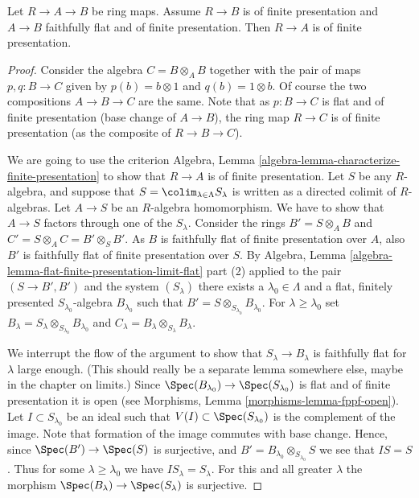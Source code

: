 \begin{lemma}
\label{lemma-flat-finitely-presented-permanence-algebra}
Let $R \to A \to B$ be ring maps.
Assume $R \to B$ is of finite presentation and
$A \to B$ faithfully flat and of finite presentation.
Then $R \to A$ is of finite presentation.
\end{lemma}

\begin{proof}
Consider the algebra $C = B \otimes_A B$ together with the
pair of maps $p, q : B \to C$ given by $p(b) = b \otimes 1$
and $q(b) = 1 \otimes b$. Of course the two compositions
$A \to B \to C$ are the same. Note that as
$p : B \to C$ is flat and of finite presentation (base change of
$A \to B$), the ring map $R \to C$ is of finite presentation
(as the composite of $R \to B \to C$).

\medskip\noindent
We are going to use the criterion
Algebra, Lemma \ref{algebra-lemma-characterize-finite-presentation}
to show that $R \to A$ is of finite presentation.
Let $S$ be any $R$-algebra, and suppose that
$S = \colim_{\lambda \in \Lambda} S_\lambda$ is written
as a directed colimit of $R$-algebras.
Let $A \to S$ be an $R$-algebra homomorphism. We have to
show that $A \to S$ factors through one of the $S_\lambda$.
Consider the rings $B' = S \otimes_A B$ and
$C' = S \otimes_A C = B' \otimes_S B'$.
As $B$ is faithfully flat of finite presentation over $A$, also $B'$
is faithfully flat of finite presentation over $S$.
By Algebra, Lemma \ref{algebra-lemma-flat-finite-presentation-limit-flat}
part (2) applied to the pair $(S \to B', B')$ and the system $(S_\lambda)$
there exists a $\lambda_0 \in \Lambda$
and a flat, finitely presented $S_{\lambda_0}$-algebra
$B_{\lambda_0}$ such that $B' = S \otimes_{S_{\lambda_0}} B_{\lambda_0}$.
For $\lambda \geq \lambda_0$ set
$B_\lambda = S_\lambda \otimes_{S_{\lambda_0}} B_{\lambda_0}$ and
$C_\lambda = B_\lambda \otimes_{S_\lambda} B_\lambda$.

\medskip\noindent
We interrupt the flow of the argument to show that $S_\lambda \to B_\lambda$
is faithfully flat for $\lambda$ large enough. (This should really
be a separate lemma somewhere else, maybe in the chapter on limits.)
Since $\Spec(B_{\lambda_0}) \to \Spec(S_{\lambda_0})$ is
flat and of finite presentation it is open (see Morphisms,
Lemma \ref{morphisms-lemma-fppf-open}).
Let $I \subset S_{\lambda_0}$ be an ideal such that
$V(I) \subset \Spec(S_{\lambda_0})$ is the complement
of the image. Note that formation of the image commutes
with base change. Hence, since $\Spec(B') \to \Spec(S)$
is surjective, and $B' = B_{\lambda_0} \otimes_{S_{\lambda_0}} S$
we see that $IS = S$. Thus for some $\lambda \geq \lambda_0$ we
have $IS_{\lambda} = S_\lambda$. For this and all greater
$\lambda$ the morphism
$\Spec(B_\lambda) \to \Spec(S_\lambda)$ is surjective.


\end{proof}
